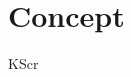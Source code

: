 \documentclass{docs}
\begin{document}
    \tableofcontents
    \pagebreak
    \section{Concept}
    KScr
\end{document}
